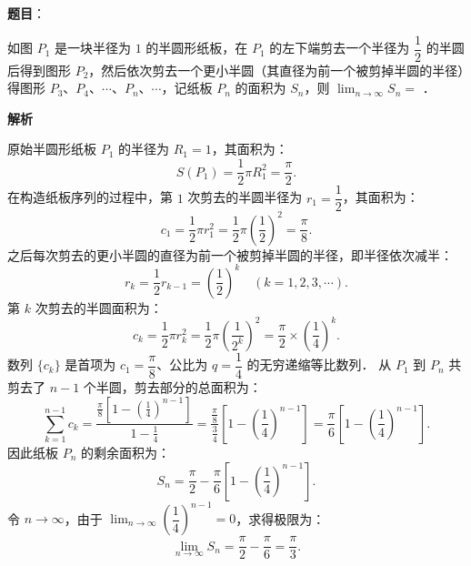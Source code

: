 \begin{answer}

\textbf{题目}：

如图 $P_1$ 是一块半径为 $1$ 的半圆形纸板，在 $P_1$ 的左下端剪去一个半径为 $\dfrac{1}{2}$ 的半圆后得到图形 $P_2$，然后依次剪去一个更小半圆（其直径为前一个被剪掉半圆的半径）得图形 $P_3$、$P_4$、$\cdots$、$P_n$、$\cdots$，记纸板 $P_n$ 的面积为 $S_n$，则 $\lim_{n \to \infty} S_n =$ \gkblank{}．
\nopagebreak[4]
\begin{center}\end{center}
\nopagebreak[4]
\textbf{解析}
\nopagebreak[4]
\begin{center}\end{center}
\nopagebreak[4]
原始半圆形纸板 $P_1$ 的半径为 $R_1 = 1$，其面积为：
\nopagebreak[4]
\[
S(P_1) = \frac{1}{2}\pi R_1^2 = \frac{\pi}{2}.
\]
在构造纸板序列的过程中，第 $1$ 次剪去的半圆半径为 $r_1 = \dfrac{1}{2}$，其面积为：
\nopagebreak[4]
\[
c_1 = \frac{1}{2}\pi r_1^2 = \frac{1}{2}\pi \left(\frac{1}{2}\right)^2 = \frac{\pi}{8}.
\]
之后每次剪去的更小半圆的直径为前一个被剪掉半圆的半径，即半径依次减半：
\nopagebreak[4]
\[
r_k = \frac{1}{2} r_{k-1} = \left(\frac{1}{2}\right)^k \quad (k = 1, 2, 3, \cdots).
\]
第 $k$ 次剪去的半圆面积为：
\nopagebreak[4]
\[
c_k = \frac{1}{2}\pi r_k^2 = \frac{1}{2}\pi \left(\frac{1}{2^k}\right)^2 = \frac{\pi}{2} \times \left(\frac{1}{4}\right)^k.
\]
数列 $\{c_k\}$ 是首项为 $c_1 = \dfrac{\pi}{8}$、公比为 $q = \dfrac{1}{4}$ 的无穷递缩等比数列．
从 $P_1$ 到 $P_n$ 共剪去了 $n - 1$ 个半圆，剪去部分的总面积为：
\nopagebreak[4]
\[
\sum_{k=1}^{n-1} c_k = \frac{\frac{\pi}{8}\left[1 - \left(\frac{1}{4}\right)^{n-1}\right]}{1 - \frac{1}{4}} = \frac{\frac{\pi}{8}}{\frac{3}{4}}\left[1 - \left(\frac{1}{4}\right)^{n-1}\right] = \frac{\pi}{6}\left[1 - \left(\frac{1}{4}\right)^{n-1}\right].
\]
因此纸板 $P_n$ 的剩余面积为：
\nopagebreak[4]
\[
S_n = \frac{\pi}{2} - \frac{\pi}{6}\left[1 - \left(\frac{1}{4}\right)^{n-1}\right].
\]
令 $n \to \infty$，由于 $\lim_{n \to \infty}\left(\dfrac{1}{4}\right)^{n-1} = 0$，求得极限为：
\nopagebreak[4]
\[
\lim_{n \to \infty} S_n = \frac{\pi}{2} - \frac{\pi}{6} = \frac{\pi}{3}.
\]


\end{answer}
